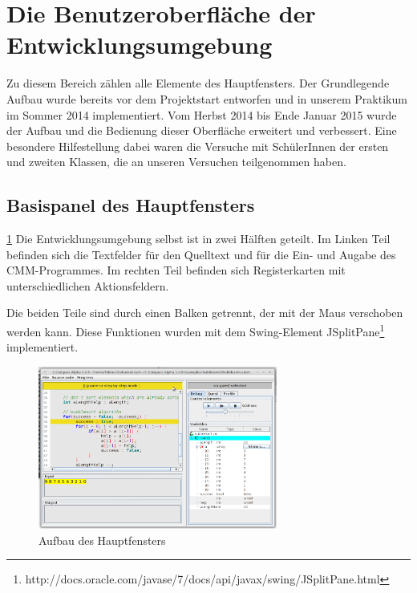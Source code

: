 



\chapter{Die Benutzeroberfläche der Entwicklungsumgebung}
\label{sec:gui-main}
Zu diesem Bereich zählen alle Elemente des Hauptfensters. Der Grundlegende Aufbau wurde bereits vor dem Projektstart entworfen und in unserem Praktikum im Sommer 2014 implementiert. Vom Herbst 2014 bis Ende Januar 2015 wurde der Aufbau und die Bedienung dieser Oberfläche erweitert und verbessert. Eine besondere Hilfestellung dabei waren die Versuche mit SchülerInnen der ersten und zweiten Klassen, die an unseren Versuchen teilgenommen haben.





\section{Basispanel des Hauptfensters}
\ref{sec:gui-main}
Die Entwicklungsumgebung selbst ist in zwei Hälften geteilt. Im Linken Teil befinden sich die Textfelder für den Quelltext und für die Ein- und Augabe des CMM-Programmes. Im rechten Teil befinden sich Registerkarten mit unterschiedlichen Aktionsfeldern.

Die beiden Teile sind durch einen Balken getrennt, der mit der Maus verschoben werden kann. Diese Funktionen wurden mit dem Swing-Element JSplitPane\footnote{http://docs.oracle.com/javase/7/docs/api/javax/swing/JSplitPane.html} implementiert.

\begin{figure}[htbp] 
  \centering
     \includegraphics[width=0.7\textwidth]{./media/images/gui/main/CCompactAlpha1-4-5-guimain.png}
  \caption{Aufbau des Hauptfensters}
  \label{fig:gui-main-1}
\end{figure}

